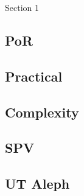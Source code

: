 \documentclass[a4paper]{article}
\begin{document}
\tableofcontents

\begin{section}{Section 1}

%
%

\subsection{PoR}

% 


\subsection{Practical}

% 





\subsection{Complexity}




\subsection{SPV}

% 

% 


\subsection{UT Aleph}

% 

% 
% 
% 
% 






% 
% 

\end{section}

\appendix

% 
\end{document}
